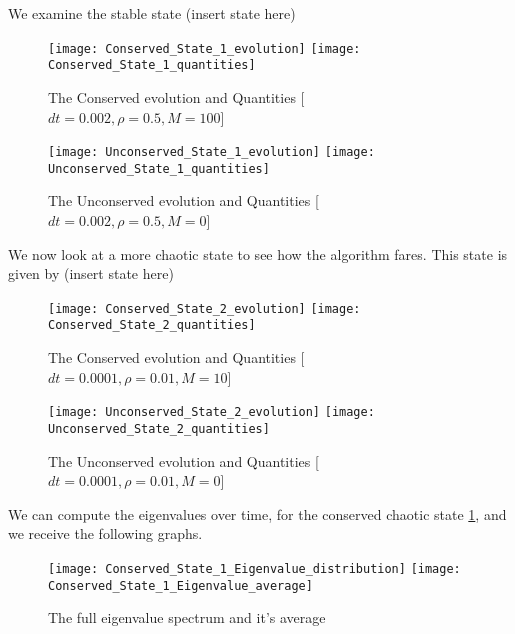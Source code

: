 
We examine the stable state (insert state here)
\begin{center}
\begin{figure}[h]
\texttt{[image: Conserved\_State\_1\_evolution]}
\texttt{[image: Conserved\_State\_1\_quantities]}
\label{fig:2}\caption{The Conserved evolution and Quantities   [$dt = 0.002, \rho = 0.5, M=100$]}
\end{figure}
\begin{figure}[h]
\texttt{[image: Unconserved\_State\_1\_evolution]}
\texttt{[image: Unconserved\_State\_1\_quantities]}
\label{fig:3}\caption{The Unconserved evolution and Quantities   [$dt = 0.002, \rho = 0.5, M=0$]}
\end{figure}
\end{center}

We now look at a more chaotic state to see how the algorithm fares. This state is given by (insert state here)
\begin{center}
\begin{figure}[h]
\texttt{[image: Conserved\_State\_2\_evolution]}
\texttt{[image: Conserved\_State\_2\_quantities]}
\label{fig:4}\caption{The Conserved evolution and Quantities   [$dt = 0.0001, \rho = 0.01, M=10$]}
\end{figure}
\begin{figure}[h]
\texttt{[image: Unconserved\_State\_2\_evolution]}
\texttt{[image: Unconserved\_State\_2\_quantities]}
\label{fig:5}\caption{The Unconserved evolution and Quantities   [$dt = 0.0001, \rho = 0.01, M=0$]}
\end{figure}
\end{center}
\pagebreak

We can compute the eigenvalues over time, for the conserved chaotic state \ref{fig:2}, and we receive the following graphs.	
\begin{center}
\begin{figure}[h]
\texttt{[image: Conserved\_State\_1\_Eigenvalue\_distribution]}
\texttt{[image: Conserved\_State\_1\_Eigenvalue\_average]}
\label{fig:6}\caption{The full eigenvalue spectrum and it's average}
\end{figure}
\end{center}

